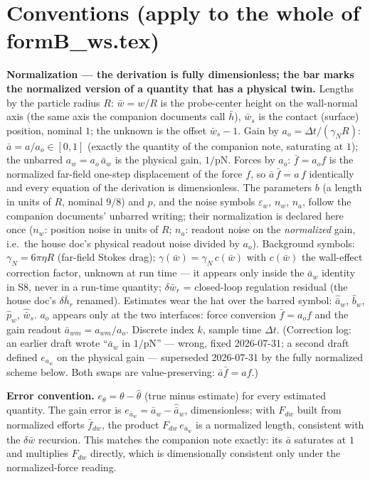 \documentclass[11pt,a4paper,fontset=none]{ctexart}
\begin{document}
\section*{Conventions (apply to the whole of formB\_ws.tex)}

\textbf{Normalization --- the derivation is fully dimensionless; the bar
marks the normalized version of a quantity that has a physical twin.}
Lengths by the particle radius $R$: $\bar{w} = w/R$ is the probe-center
height on the wall-normal axis (the same axis the companion documents call
$\bar{h}$), $\bar{w}_s$ is the contact (surface) position, nominal $1$; the
unknown is the offset $\bar{w}_s - 1$.  Gain by
$a_o = \Delta t/(\gamma_N R)$: $\bar{a} = a/a_o \in [0,1]$ (exactly the
quantity of the companion note, saturating at $1$); the unbarred
$a_w = a_o\,\bar{a}_w$ is the physical gain, $1/\mathrm{pN}$.  Forces by
$a_o$: $\bar{f} = a_o f$ is the normalized far-field one-step displacement
of the force $f$, so $\bar{a}\,\bar{f} = a\,f$ identically and every
equation of the derivation is dimensionless.  The parameters $b$ (a length
in units of $R$, nominal $9/8$) and $p$, and the noise symbols
$\varepsilon_w$, $n_w$, $n_a$, follow the companion documents' unbarred
writing; their normalization is declared here once ($n_w$: position noise
in units of $R$; $n_a$: readout noise on the \emph{normalized} gain,
i.e.\ the house doc's physical readout noise divided by $a_o$).
Background symbols: $\gamma_N = 6\pi\eta R$ (far-field Stokes drag);
$\gamma(\bar{w}) = \gamma_N\,c(\bar{w})$ with $c(\bar{w})$ the wall-effect
correction factor, unknown at run time --- it appears only inside the
$\bar{a}_w$ identity in S8, never in a run-time quantity;
$\delta\bar{w}_r$ = closed-loop regulation residual (the house doc's
$\delta\bar{h}_r$ renamed).  Estimates wear the hat over the
barred symbol: $\hat{\bar{a}}_w$, $\hat{b}_w$, $\hat{p}_w$,
$\hat{\bar{w}}_s$.  $a_o$ appears only at the two interfaces: force conversion
$\bar{f} = a_o f$ and the gain readout $\bar{a}_{wm} = a_{wm}/a_o$.
Discrete index $k$, sample time $\Delta t$.
(Correction log: an earlier draft wrote ``$\bar{a}_w$ in $1/\mathrm{pN}$''
--- wrong, fixed 2026-07-31; a second draft defined $e_{a_w}$ on the
physical gain --- superseded 2026-07-31 by the fully normalized scheme
below.  Both swaps are value-preserving: $\bar{a}\bar{f} = af$.)

\textbf{Error convention.}  $e_{\theta} = \theta - \hat{\theta}$ (true minus
estimate) for every estimated quantity.  The gain error is
$e_{\bar{a}_w} = \bar{a}_w - \hat{\bar{a}}_w$, dimensionless; with $F_{dw}$
built from normalized efforts $\bar{f}_{dw}$, the product
$F_{dw}\,e_{\bar{a}_w}$ is a normalized length, consistent with the
$\delta\bar{w}$ recursion.  This matches the companion note exactly: its
$\bar{a}$ saturates at $1$ and multiplies $F_{dw}$ directly, which is
dimensionally consistent only under the normalized-force reading.
\end{document}

